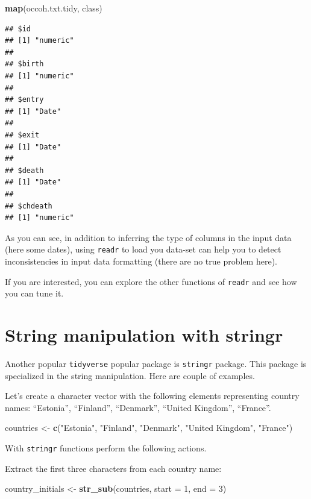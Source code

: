 \documentclass[
]{book}
\newenvironment{Shaded}{\begin{snugshade}}{\end{snugshade}}
\newcommand{\AttributeTok}[1]{\textcolor[rgb]{0.13,0.29,0.53}{#1}}
\newcommand{\DecValTok}[1]{\textcolor[rgb]{0.00,0.00,0.81}{#1}}
\newcommand{\FunctionTok}[1]{\textcolor[rgb]{0.13,0.29,0.53}{\textbf{#1}}}
\newcommand{\NormalTok}[1]{#1}
\newcommand{\OtherTok}[1]{\textcolor[rgb]{0.56,0.35,0.01}{#1}}
\newcommand{\StringTok}[1]{\textcolor[rgb]{0.31,0.60,0.02}{#1}}
\begin{document}
\begin{Shaded}
\begin{Highlighting}[]
\FunctionTok{map}\NormalTok{(occoh.txt.tidy, class)}
\end{Highlighting}
\end{Shaded}

\begin{verbatim}
## $id
## [1] "numeric"
## 
## $birth
## [1] "numeric"
## 
## $entry
## [1] "Date"
## 
## $exit
## [1] "Date"
## 
## $death
## [1] "Date"
## 
## $chdeath
## [1] "numeric"
\end{verbatim}

As you can see, in addition to inferring the type of columns in the input data (here some dates), using \texttt{readr} to load you data-set can help you to detect inconsistencies in input data formatting (there are no true problem here).

If you are interested, you can explore the other functions of \texttt{readr} and see how you can tune it.

\section{String manipulation with stringr}\label{string-manipulation-with-stringr}

Another popular \texttt{tidyverse} popular package is \texttt{stringr} package. This package is specialized in the string manipulation. Here are couple of examples.

Let's create a character vector with the following elements representing country names: ``Estonia'', ``Finland'', ``Denmark'', ``United Kingdom'', ``France''.

\begin{Shaded}
\begin{Highlighting}[]
\NormalTok{countries }\OtherTok{\textless{}{-}} 
  \FunctionTok{c}\NormalTok{(}\StringTok{"Estonia"}\NormalTok{, }\StringTok{"Finland"}\NormalTok{, }\StringTok{"Denmark"}\NormalTok{, }\StringTok{"United Kingdom"}\NormalTok{, }\StringTok{"France"}\NormalTok{)}
\end{Highlighting}
\end{Shaded}

With \texttt{stringr} functions perform the following actions.

Extract the first three characters from each country name:

\begin{Shaded}
\begin{Highlighting}[]
\NormalTok{country\_initials }\OtherTok{\textless{}{-}} \FunctionTok{str\_sub}\NormalTok{(countries, }\AttributeTok{start =} \DecValTok{1}\NormalTok{, }\AttributeTok{end =} \DecValTok{3}\NormalTok{)}
\end{Highlighting}
\end{Shaded}
\end{document}
